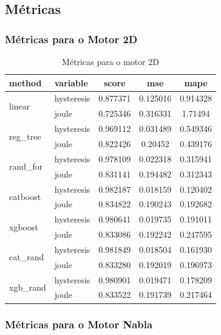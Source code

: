 \documentclass{article}
\begin{document}
\subsection{Métricas}

\subsubsection{Métricas para o Motor 2D}

\begin{table}[h!]
\centering
\caption{Métricas para o motor 2D}
\begin{tabular}{llccc}
\toprule
\textbf{method} & \textbf{variable} & \textbf{score} & \textbf{mse} & \textbf{mape} \\
\midrule
\multirow{2}{*}{linear} 
    & hysteresis & 0.877371 & 0.125016 & 0.914328 \\
    & joule      & 0.725346 & 0.316331 & 1.71494 \\
\midrule
\multirow{2}{*}{reg\_tree} 
    & hysteresis & 0.969112 & 0.031489 & 0.549346 \\
    & joule      & 0.822426 & 0.20452 & 0.439176 \\
\midrule
\multirow{2}{*}{rand\_for} 
    & hysteresis & 0.978109 & 0.022318 & 0.315941 \\
    & joule      & 0.831141 & 0.194482 & 0.312343 \\
\midrule
\multirow{2}{*}{catboost} 
    & hysteresis & 0.982187 & 0.018159 & 0.120402 \\
    & joule      & 0.834822 & 0.190243 & 0.192682 \\
\midrule
\multirow{2}{*}{xgboost} 
    & hysteresis & 0.980641 & 0.019735 & 0.191011 \\
    & joule      & 0.833086 & 0.192242 & 0.247595 \\
\midrule
\multirow{2}{*}{cat\_rand} 
    & hysteresis & 0.981849 & 0.018504 & 0.161930 \\
    & joule      & 0.833280 & 0.192019 & 0.196973 \\
\midrule
\multirow{2}{*}{xgb\_rand} 
    & hysteresis & 0.980901 & 0.019471 & 0.178209 \\
    & joule      & 0.833522 & 0.191739 & 0.217464 \\
\bottomrule
\end{tabular}
\end{table}


\subsubsection{Métricas para o Motor Nabla}
\end{document}
